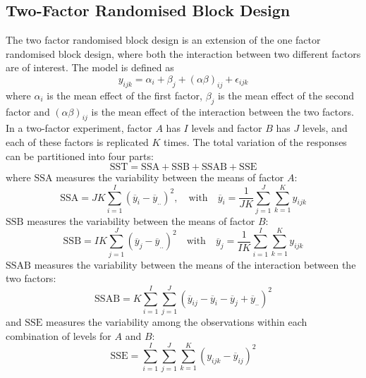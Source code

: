 \documentclass{article}
\begin{document}
\subsection{Two-Factor Randomised Block Design}
The two factor randomised block design is an extension of the one
factor randomised block design, where both the interaction between two
different factors are of interest. The model is defined as
\begin{equation*}
    y_{ijk} = \alpha_i + \beta_j + \left( \alpha \beta \right)_{ij} + \epsilon_{ijk}
\end{equation*}
where \(\alpha_i\) is the mean effect of the first factor, \(\beta_j\) is the mean effect of the second
factor and \(\left( \alpha \beta \right)_{ij}\) is the mean effect of the interaction between the two factors. In a two-factor experiment, factor \(A\) has \(I\) levels and factor
\(B\) has \(J\) levels, and each of these factors is replicated \(K\)
times. The total variation of the responses can be partitioned into
four parts:
\begin{equation*}
    \mathrm{SST} = \mathrm{SSA} + \mathrm{SSB} + \mathrm{SSAB} + \mathrm{SSE}
\end{equation*}
where \(\mathrm{SSA}\) measures the variability between the means of factor \(A\):
\begin{equation*}
    \mathrm{SSA} = JK \sum_{i = 1}^I \left( \overline{y}_i - \overline{y}_{..} \right)^2, \quad \text{with} \quad  \overline{y}_i = \frac{1}{JK} \sum_{j = 1}^J \sum_{k = 1}^K y_{ijk}
\end{equation*}
\(\mathrm{SSB}\) measures the variability between the means of factor \(B\):
\begin{equation*}
    \mathrm{SSB} = IK \sum_{j = 1}^J \left( \overline{y}_j - \overline{y}_{..} \right)^2 \quad \text{with} \quad \overline{y}_j = \frac{1}{IK} \sum_{i = 1}^I \sum_{k = 1}^K y_{ijk}
\end{equation*}
\(\mathrm{SSAB}\) measures the variability between the means of the interaction between the two factors:
\begin{equation*}
    \mathrm{SSAB} = K \sum_{i = 1}^I \sum_{j = 1}^J \left( \overline{y}_{ij} - \overline{y}_i - \overline{y}_j + \overline{y}_{..} \right)^2
\end{equation*}
and \(\mathrm{SSE}\) measures the variability among the observations within each combination of levels for \(A\) and \(B\):
\begin{equation*}
    \mathrm{SSE} = \sum_{i = 1}^I \sum_{j = 1}^J \sum_{k = 1}^K \left( y_{ijk} - \overline{y}_{ij} \right)^2
\end{equation*}
\end{document}
